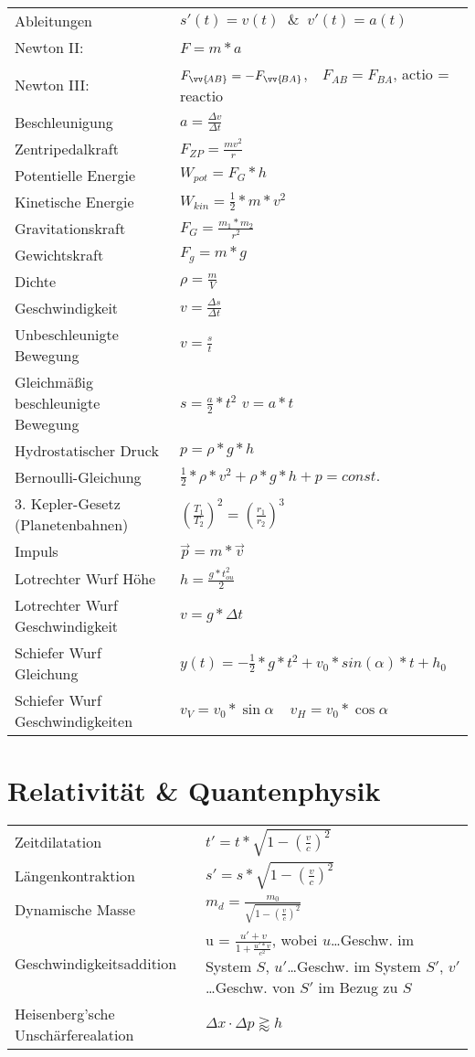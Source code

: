 \documentclass[12pt,a4paper]{paper}
\begin{document}
\begin{tabularx}{\textwidth}{X|X}
	Ableitungen & $s'(t) = v(t) \;\;\&\;\; v'(t) = a(t)$\\
	Newton II: & $F=m*a$\\
	Newton III: & ${F}_{\vv{\!AB}}=-{F}_{\vv{\!BA}}$,$\quad F_{AB} = F_{BA}$, actio = reactio \\
	Beschleunigung & $a=\frac{\Delta v}{\Delta t}$\\
	Zentripedalkraft & $F_{ZP}=\frac{mv^2}{r}$\\
	Potentielle Energie & $W_{pot} = F_G * h$\\
	Kinetische Energie & $W_{kin} = \frac{1}{2}*m*v^2$ \\
	Gravitationskraft & $F_G = \frac{m_1 * m_2 }{r^2}$\\
	Gewichtskraft & $F_g = m * g$\\
	Dichte & $\rho = \frac{m}{V}$\\
	Geschwindigkeit & $v = \frac{\Delta s}{\Delta t}$\\
	Unbeschleunigte Bewegung & $ v = \frac{s}{t}$\\
	Gleichmäßig beschleunigte Bewegung & $s = \frac{a}{2}*t^2$ \hspace{.5cm} $v = a * t $\\
	Hydrostatischer Druck & $p = \rho * g * h$ \\
	Bernoulli-Gleichung & $\frac{1}{2}*\rho*v^2 + \rho * g * h + p = const.$\\
	3. Kepler-Gesetz (Planetenbahnen) & $ (\frac{T_1}{T_2})^2 = (\frac{r_1}{r_2})^3$\\
	Impuls & $\vec{p} = m * \vec{v}$\\
	Lotrechter Wurf Höhe & $h = \frac{g* t_{ou}^2}{2}$\\
	Lotrechter Wurf Geschwindigkeit & $v = g * \Delta t$\\
	Schiefer Wurf Gleichung & $y(t) = -\frac{1}{2}*g*t^2 + v_0*sin(\alpha)*t + h_0$\\
	Schiefer Wurf Geschwindigkeiten & $v_{V} = v_0 * \sin{\alpha} \:\:\:\:\: v_{H} = v_0 * \cos\alpha$\\
\end{tabularx}
\section{Relativität \& Quantenphysik}
\begin{tabularx}{\textwidth}{X|X}
Zeitdilatation & $t' = t * \sqrt{1- (\frac{v}{c})^2}$\\
Längenkontraktion & $s' = s * \sqrt{1- (\frac{v}{c})^2}$\\
Dynamische Masse & $m_{d} = \frac{m_0}{\sqrt{1- (\frac{v}{c})^2}}$\\
Geschwindigkeitsaddition & u = $\frac{{u' + v}}{{1 + \frac{{u'  * v}}{{{c^2}}}}} $, wobei $u$\dots Geschw. im System $S$, $u'$\dots Geschw. im System $S'$, $v'$\dots Geschw. von $S'$ im Bezug zu $S$\\
Heisenberg'sche Unschärferealation & $\Delta x \cdot \Delta p \gtrapprox h $

\end{tabularx}
\end{document}
